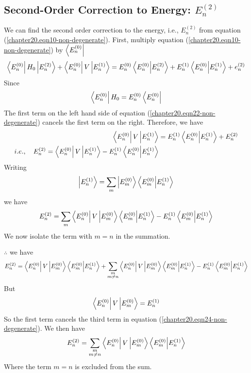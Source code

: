 	
	\subsection{Second-Order Correction to Energy: $E_n^{(2)}$}
	
	We can find the second order correction to the energy, i.e., $E^{(2)}_n$ from equation (\ref{chapter20.eqn10-non-degenerate}). First, multiply equation (\ref{chapter20.eqn10-non-degenerate}) by $\bra{E_n^{(0)}}$ 
	\begin{equation}
		\bra{E_n^{(0)}} H_0 \ket{E_n^{(2)}} + \bra{E_n^{(0)}} V \ket{E_n^{(1)}} = E_n^{(0)} \braket{E_n^{(0)}}{E_n^{(2)}} + E_n^{(1)} \braket{E_n^{(0)}}{E_n^{(1)}} + e_n^{(2)}
		\label{chapter20.eqn22-non-degenerate}
	\end{equation}
	Since
	\begin{equation}
		\bra{E_n^{(0)}} H_0 = E_n^{(0)} \bra{E_n^{(0)}}
	\end{equation}
	The first term on the left hand side of equation (\ref{chapter20.eqn22-non-degenerate}) cancels the first term on the right. Therefore, we have
	\begin{align}
		\bra{E_n^{(0)}} V \ket{E_n^{(1)}} 
		&=  E_n^{(1)} \braket{E_n^{(0)}}{E_n^{(1)}} + E_n^{(2)}\\
		i.e., \quad E_n^{(2)} =  \bra{E_n^{(0)}} V \ket{E_n^{(1)}}  - E_n^{(1)} \braket{E_n^{(0)}}{E_n^{(1)}}
		\label{chapter20.eqn23-non-degenerate}
	\end{align}
	Writing
	\begin{equation}
		\ket{E_n^{(1)}} = \sum_{m} \ket{E_m^{(0)}} \braket{E_m^{(0)}}{E_n^{(1)}}
	\end{equation}
	we have
	\begin{equation}
		E_n^{(2)} = \sum_{m} \bra{E_n^{(0)}} V \ket{E_m^{(0)}} \braket{E_m^{(0)}}{E_n^{(1)}}  -  E_n^{(1)} \braket{E_m^{(0)}}{E_n^{(1)}}
	\end{equation}
	We now isolate the term with $m=n$ in the summation.
	
	$\therefore$ we have
	\begin{equation}
		E_n^{(2)} = \bra{E_n^{(0)}} V \ket{E_m^{(0)}} \braket{E_m^{(0)}}{E_n^{(1)}} + \sum_{\substack{m\\ m \neq n}} \bra{E_n^{(0)}} V \ket{E_m^{(0)}} \braket{E_m^{(0)}}{E_n^{(1)}}  -  E_n^{(1)} \braket{E_m^{(0)}}{E_n^{(1)}}
		\label{chapter20.eqn24-non-degenerate}
	\end{equation}
	But
	\begin{equation}
		\bra{E_n^{(0)}} V \ket{E_m^{(0)}} = E_n^{(1)}
	\end{equation}
	So the first term cancels the third term in equation (\ref{chapter20.eqn24-non-degenerate}). We then have
	\begin{equation}
		E_n^{(2)} = \sum_{\substack{m\\ m \neq n}} \bra{E_n^{(0)}} V \ket{E_m^{(0)}} \braket{E_m^{(0)}}{E_n^{(1)}}
		\label{chapter20.eqn25-non-degenerate}
	\end{equation}
	Where the 
	term $m=n$ is excluded from the sum.

